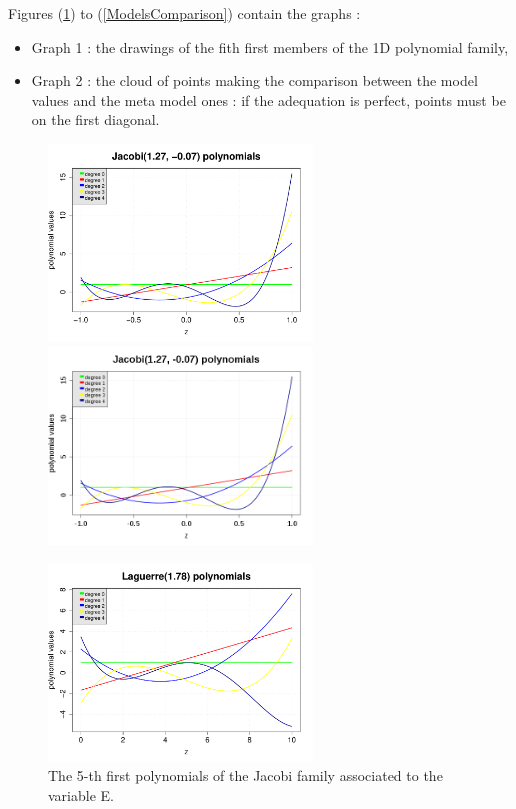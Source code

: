 \documentclass[11pt]{article}
\begin{document}
Figures (\ref{PCE_E}) to (\ref{ModelsComparison}) contain the graphs :

\begin{itemize}
\item Graph 1 : the drawings of the fith first members of the 1D polynomial family,
\item Graph 2 : the cloud of points making the comparison between the model values and the meta model ones : if the adequation is perfect, points must be on the first diagonal.
\end{itemize}


\begin{figure}[Hhbtp]
  \begin{minipage}{9cm}
    \begin{center}
      \ifpdf
      \includegraphics[width=7cm]{PCE_JacobiPolynomials_VariableE.pdf}
      \else
      \includegraphics[width=7cm]{PCE_JacobiPolynomials_VariableE.png}
      \fi
      \caption{The 5-th first polynomials of the Jacobi family associated to the variable E.}
      \label{PCE_E}
    \end{center}
  \end{minipage}
  \hfill
  \begin{minipage}{9cm}
    \begin{center}
      \ifpdf
      \includegraphics[width=7cm]{PCE_LaguerrePolynomials_VariableF.pdf}

\end{center}
\end{minipage}
\end{figure}
\end{document}
